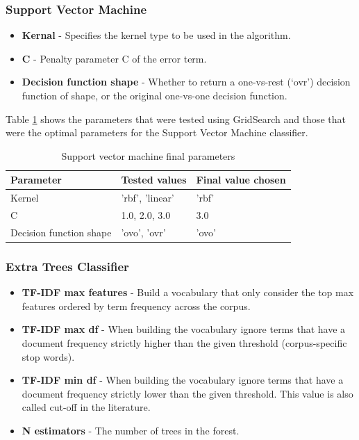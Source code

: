 \documentclass[a4paper,11pt]{report}
\begin{document}
\subsubsection{Support Vector Machine}
\begin{itemize}
	\item \textbf{Kernal} - Specifies the kernel type to be used in the algorithm.
	\item \textbf{C} - Penalty parameter C of the error term.
	\item \textbf{Decision function shape} - Whether to return a one-vs-rest (‘ovr’) decision function of shape, or the original one-vs-one decision function.
\end{itemize}

Table \ref{svm-finalp} shows the parameters that were tested using GridSearch and those that were the optimal parameters for the Support Vector Machine classifier.

\begin{table}[h!]
\centering
\caption{Support vector machine final parameters}
\label{svm-finalp}
\begin{tabular}{|l|l|l|}
\hline
Parameter               & Tested values   & Final value chosen \\ \hline
Kernel                  & 'rbf', 'linear' & 'rbf'              \\ \hline
C                       & 1.0, 2.0, 3.0   & 3.0                \\ \hline
Decision function shape & 'ovo', 'ovr'    & 'ovo'              \\ \hline
\end{tabular}
\end{table}

\subsubsection{Extra Trees Classifier}
\begin{itemize}
	\item \textbf{TF-IDF max features} - Build a vocabulary that only consider the top max features ordered by term frequency across the corpus.
	\item \textbf{TF-IDF max df} - When building the vocabulary ignore terms that have a document frequency strictly higher than the given threshold (corpus-specific stop words).
	\item \textbf{TF-IDF min df} - When building the vocabulary ignore terms that have a document frequency strictly lower than the given threshold. This value is also called cut-off in the literature.
	\item \textbf{N estimators} - The number of trees in the forest.
\end{itemize}
\end{document}
